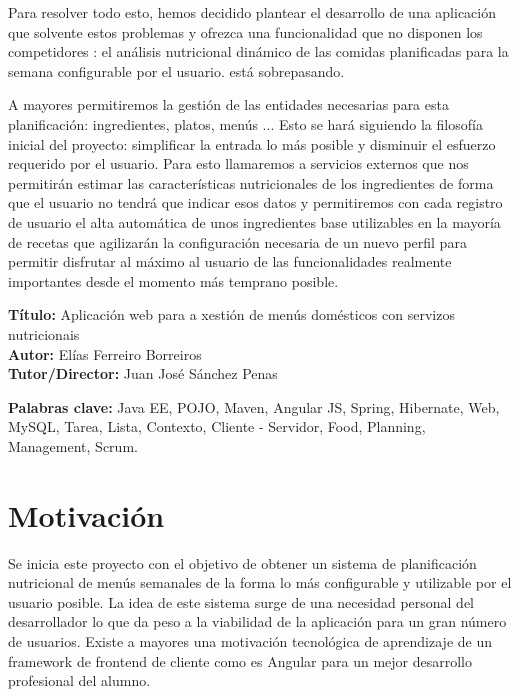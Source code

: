 \documentclass[12pt, a4paper, twoside]{book}
\begin{document}
	Para resolver todo esto, hemos decidido plantear el desarrollo de una aplicación que solvente estos problemas y ofrezca una funcionalidad que no disponen los competidores : el análisis nutricional dinámico de las comidas planificadas para la semana configurable por el usuario. está sobrepasando.

	A mayores permitiremos la gestión de las entidades necesarias para esta planificación: ingredientes, platos, menús ... 
	Esto se hará siguiendo la filosofía inicial del proyecto: simplificar la entrada lo más posible y disminuir el esfuerzo requerido por el usuario. 
	Para esto llamaremos a servicios externos que nos permitirán estimar las características nutricionales de los ingredientes de forma que el usuario no tendrá que indicar esos datos y permitiremos con cada registro de usuario el alta automática de unos ingredientes base utilizables en la mayoría de recetas que agilizarán la configuración necesaria de un nuevo perfil para permitir disfrutar al máximo al usuario de las funcionalidades realmente importantes desde el momento más temprano posible.
	
	\clearpage
	
	\textbf{Título:} Aplicación web para a xestión de menús domésticos con servizos nutricionais
	\\
	\textbf{Autor:} Elías Ferreiro Borreiros
	\\
	\textbf{Tutor/Director:} Juan José Sánchez Penas
	
	
	\textbf{Palabras clave:} Java EE, POJO, Maven, Angular JS, Spring, Hibernate, Web, MySQL, Tarea, Lista, Contexto, Cliente - Servidor, Food, Planning, Management, Scrum. 
	
	
	\renewcommand{\contentsname}{Índice de contenidos}
	\renewcommand{\listfigurename}{Índice de figuras}
	\renewcommand{\listtablename}{Índice de tablas}
	
	\tableofcontents %
	
	\listoffigures %
	
	\listoftables %
	
	\clearpage
	
	\chapter{Motivación}
	Se inicia este proyecto con el objetivo de obtener un sistema de planificación nutricional de menús semanales de la forma lo más configurable y utilizable por el usuario posible.
	La idea de este sistema surge de una necesidad personal del desarrollador lo que da peso a la viabilidad de la aplicación para un gran número de usuarios.
	Existe a mayores una motivación tecnológica de aprendizaje de un framework de frontend de cliente como es Angular para un mejor desarrollo profesional del alumno.
\end{document}
